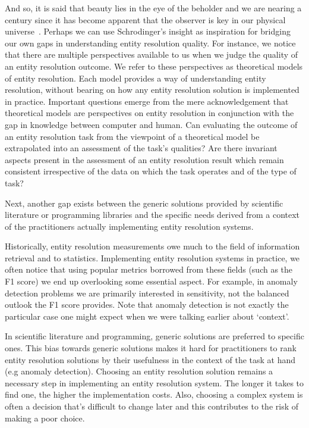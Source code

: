And so, it is said that beauty lies in the eye of the beholder and we are
nearing a century since it has become apparent that the observer is key in
our physical universe~\cite{schrodinger1926}.
Perhaps we can use Schrodinger's insight as inspiration for bridging our own
gaps in understanding entity resolution quality.
For instance, we notice that there are multiple perspectives available to us
when we judge the quality of an entity resolution outcome.
We refer to these perspectives as theoretical models of entity resolution.
Each model provides a way of understanding entity resolution, without bearing on
how any entity resolution solution is implemented in practice.
Important questions emerge from the mere acknowledgement that theoretical models
are perspectives on entity resolution in conjunction with the gap in knowledge
between computer and human.
Can evaluating the outcome of an entity resolution task from the viewpoint of a
theoretical model be extrapolated into an assessment of the task's qualities?
Are there invariant aspects present in the assessment of an entity resolution
result which remain consistent irrespective of the data on which the task
operates and of the type of task?

Next, another gap exists between the generic solutions provided by scientific
literature or programming libraries and the specific needs derived from a
context of the practitioners actually implementing entity resolution
systems.

Historically, entity resolution measurements owe much to the field of
information retrieval and to statistics.
Implementing entity resolution systems in practice, we often notice that
using popular metrics borrowed from these fields (such as the F1 score) we
end up overlooking some essential aspect.
For example, in anomaly detection problems we are primarily interested in
sensitivity, not the balanced outlook the F1 score provides.
Note that anomaly detection is not exactly the particular case one might
expect when we were talking earlier about `context'.

In scientific literature and programming, generic solutions are preferred to
specific ones.
This bias towards generic solutions makes it hard for practitioners to rank
entity resolution solutions by their usefulness in the context of the task
at hand (e.g anomaly detection).
Choosing an entity resolution solution remains a necessary step in
implementing an entity resolution system.
The longer it takes to find one, the higher the implementation costs.
Also, choosing a complex system is often a decision that's difficult to
change later and this contributes to the risk of making a poor choice.

